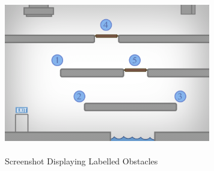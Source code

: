 \documentclass[a4paper,oneside]{report}
\begin{document}
\begin{figure}[H]
\centering    
\includegraphics[width=90mm]{sources/images/Level2} \paragraph{}
\caption{Screenshot Displaying Labelled Obstacles}
\end{figure}
\end{document}
